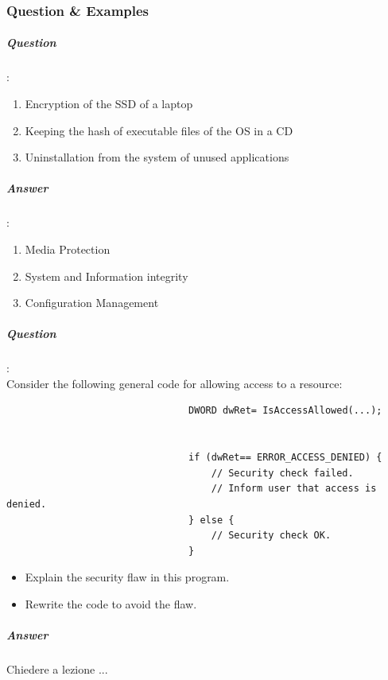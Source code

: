 \documentclass{article}
\begin{document}
            \subsubsection{Question \& Examples}
                        \subparagraph{Question}: 
                        \begin{enumerate}
                            \item Encryption of the SSD of a laptop
                            \item Keeping the hash of executable files of the OS in a CD
                            \item Uninstallation from the system of unused applications
                        \end{enumerate}
                        \subparagraph{Answer}:
                            \begin{enumerate}
                                \item Media Protection
                                \item System and Information integrity
                                \item Configuration Management
                            \end{enumerate}
                        \subparagraph{Question}:\\
                        Consider the following general code for allowing access to a resource:
                            \begin{lstlisting}
                                DWORD dwRet= IsAccessAllowed(...);

                                
                                if (dwRet== ERROR_ACCESS_DENIED) {
                                    // Security check failed.
                                    // Inform user that access is denied.
                                } else {
                                    // Security check OK.
                                }
                            \end{lstlisting}
                            \begin{itemize}
                                \item Explain the security flaw in this program.
                                \item Rewrite the code to avoid the flaw.
                            \end{itemize}
                        \subparagraph{Answer}
                        Chiedere a lezione ...
\end{document}
